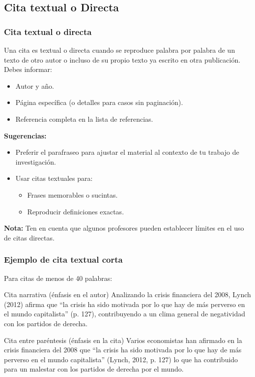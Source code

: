 \documentclass[
11pt, %
]{beamer}
\begin{document}
\subsection{Cita textual o Directa}

\begin{frame}
	\frametitle{Cita textual o directa}

	\begin{block}{}
		Una cita es textual o directa cuando se reproduce palabra por palabra de un texto de otro autor o incluso de su propio texto ya escrito en otra publicación. Debes informar:
	\end{block}

	\begin{itemize}
		\item Autor y año.
		\item Página específica (o detalles para casos sin paginación).
		\item Referencia completa en la lista de referencias.
	\end{itemize}

	\textbf{Sugerencias:}
	\begin{itemize}
		\item Preferir el parafraseo para ajustar el material al contexto de tu trabajo de investigación.
		\item Usar citas textuales para:
		      \begin{itemize}
			      \item {\color{blue}Frases memorables o sucintas.}
			      \item {\color{blue}Reproducir definiciones exactas.}
		      \end{itemize}
	\end{itemize}
	\textbf{Nota:} Ten en cuenta que algunos profesores pueden establecer límites en el uso de citas directas.
\end{frame}

\begin{frame}
	\frametitle{Ejemplo de cita textual corta}

	Para citas de menos de 40 palabras:

	\begin{exampleblock}{Cita narrativa (énfasis en el autor)}
		Analizando la crisis financiera del 2008, {\color{blue}Lynch (2012)} afirma que {\color{blue}``}la crisis ha sido motivada por lo que hay de más perverso en el mundo capitalista{\color{blue}'' (p. 127)}, contribuyendo a un clima general de negatividad con los partidos de derecha.
	\end{exampleblock}

	\begin{exampleblock}{Cita entre paréntesis (énfasis en la cita)}
		Varios economistas han afirmado en la crisis financiera del 2008 que {\color{blue}``}la crisis ha sido motivada por lo que hay de más perverso en el mundo capitalista{\color{blue}'' (Lynch, 2012, p. 127)} lo que ha contribuido para un malestar con los partidos de derecha por el mundo.
	\end{exampleblock}

\end{frame}
\end{document}
